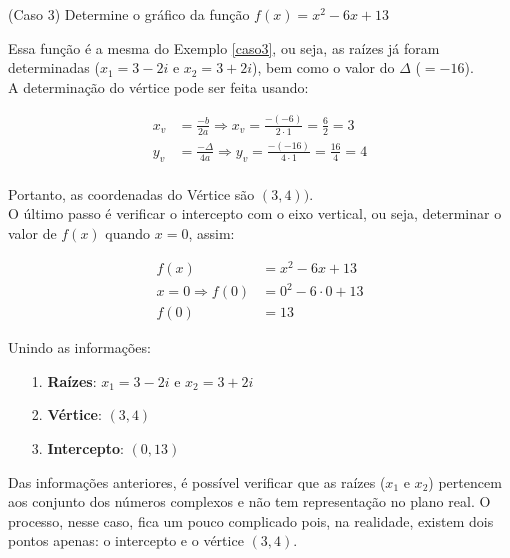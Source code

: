 \begin{example}
	(Caso 3) Determine o gráfico da função $f(x)=x^2-6x+13$
	
	\solucao
	
	Essa função é a mesma do Exemplo \ref{caso3}, ou seja, as raízes já foram determinadas ($x_1 = 3-2i$ e $x_2 = 3+2i$), bem como o valor do $\Delta$ ($= -16$).\\
	
	A determinação do vértice pode ser feita usando:
	
	\begin{ceqn}
		\begin{align*}
		x_v &= \frac{-b}{2a} \Rightarrow x_v = \frac{-(-6)}{2 \cdot 1} = \frac{6}{2} = 3 \\
		y_v &= \frac{-\Delta}{4a} \Rightarrow y_v = \frac{-(-16)}{4 \cdot 1} = \frac{16}{4}=4 \\
		\end{align*}
	\end{ceqn}
	
	Portanto, as coordenadas do Vértice são $(3,4))$.\\
	
	O último passo é verificar o intercepto com o eixo vertical, ou seja, determinar o valor de $f(x)$ quando $x=0$, assim:
	
	\begin{ceqn}
		\begin{align*}
		f(x) &= x^2-6x+13 \\
		x=0 \Rightarrow f(0)&=0^2-6 \cdot 0 +13 \\
		f(0) &= 13 
		\end{align*}
	\end{ceqn}
	
	Unindo as informações:\\
	\begin{itemize}
		\item[1.]{\textbf{Raízes}: $x_1=3-2i$ e $x_2=3+2i$}
		\item[2.]{\textbf{Vértice}: $(3,4)$}
		\item[3.]{\textbf{Intercepto}: $(0,13)$}\\
	\end{itemize}
	Das informações anteriores, é possível verificar que as raízes ($x_1$ e $x_2$) pertencem aos conjunto dos números complexos e não tem representação no plano real. O processo, nesse caso, fica um pouco complicado pois, na realidade, existem dois pontos apenas: o intercepto e o vértice $(3,4)$.\\
	

\end{example}
